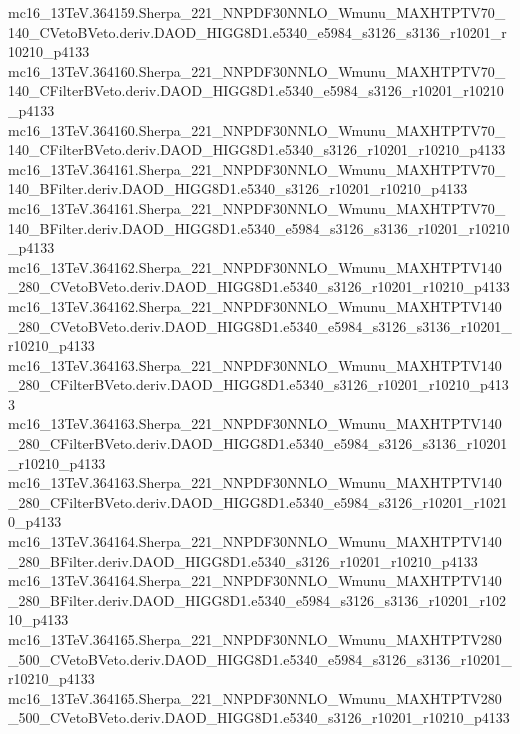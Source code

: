 \begin{scriptsize}
mc16\_13TeV.364159.Sherpa\_221\_NNPDF30NNLO\_Wmunu\_MAXHTPTV70\_140\_CVetoBVeto.deriv.DAOD\_HIGG8D1.e5340\_e5984\_s3126\_s3136\_r10201\_r10210\_p4133 \\
mc16\_13TeV.364160.Sherpa\_221\_NNPDF30NNLO\_Wmunu\_MAXHTPTV70\_140\_CFilterBVeto.deriv.DAOD\_HIGG8D1.e5340\_e5984\_s3126\_r10201\_r10210\_p4133 \\
mc16\_13TeV.364160.Sherpa\_221\_NNPDF30NNLO\_Wmunu\_MAXHTPTV70\_140\_CFilterBVeto.deriv.DAOD\_HIGG8D1.e5340\_s3126\_r10201\_r10210\_p4133 \\
mc16\_13TeV.364161.Sherpa\_221\_NNPDF30NNLO\_Wmunu\_MAXHTPTV70\_140\_BFilter.deriv.DAOD\_HIGG8D1.e5340\_s3126\_r10201\_r10210\_p4133 \\
mc16\_13TeV.364161.Sherpa\_221\_NNPDF30NNLO\_Wmunu\_MAXHTPTV70\_140\_BFilter.deriv.DAOD\_HIGG8D1.e5340\_e5984\_s3126\_s3136\_r10201\_r10210\_p4133 \\
mc16\_13TeV.364162.Sherpa\_221\_NNPDF30NNLO\_Wmunu\_MAXHTPTV140\_280\_CVetoBVeto.deriv.DAOD\_HIGG8D1.e5340\_s3126\_r10201\_r10210\_p4133 \\
mc16\_13TeV.364162.Sherpa\_221\_NNPDF30NNLO\_Wmunu\_MAXHTPTV140\_280\_CVetoBVeto.deriv.DAOD\_HIGG8D1.e5340\_e5984\_s3126\_s3136\_r10201\_r10210\_p4133 \\
mc16\_13TeV.364163.Sherpa\_221\_NNPDF30NNLO\_Wmunu\_MAXHTPTV140\_280\_CFilterBVeto.deriv.DAOD\_HIGG8D1.e5340\_s3126\_r10201\_r10210\_p4133 \\
mc16\_13TeV.364163.Sherpa\_221\_NNPDF30NNLO\_Wmunu\_MAXHTPTV140\_280\_CFilterBVeto.deriv.DAOD\_HIGG8D1.e5340\_e5984\_s3126\_s3136\_r10201\_r10210\_p4133 \\
mc16\_13TeV.364163.Sherpa\_221\_NNPDF30NNLO\_Wmunu\_MAXHTPTV140\_280\_CFilterBVeto.deriv.DAOD\_HIGG8D1.e5340\_e5984\_s3126\_r10201\_r10210\_p4133 \\
mc16\_13TeV.364164.Sherpa\_221\_NNPDF30NNLO\_Wmunu\_MAXHTPTV140\_280\_BFilter.deriv.DAOD\_HIGG8D1.e5340\_s3126\_r10201\_r10210\_p4133 \\
mc16\_13TeV.364164.Sherpa\_221\_NNPDF30NNLO\_Wmunu\_MAXHTPTV140\_280\_BFilter.deriv.DAOD\_HIGG8D1.e5340\_e5984\_s3126\_s3136\_r10201\_r10210\_p4133 \\
mc16\_13TeV.364165.Sherpa\_221\_NNPDF30NNLO\_Wmunu\_MAXHTPTV280\_500\_CVetoBVeto.deriv.DAOD\_HIGG8D1.e5340\_e5984\_s3126\_s3136\_r10201\_r10210\_p4133 \\
mc16\_13TeV.364165.Sherpa\_221\_NNPDF30NNLO\_Wmunu\_MAXHTPTV280\_500\_CVetoBVeto.deriv.DAOD\_HIGG8D1.e5340\_s3126\_r10201\_r10210\_p4133 \\

\end{scriptsize}
